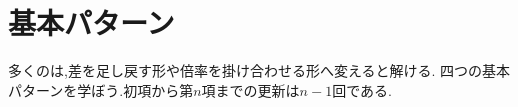 
\section{基本パターン}\label{節：基本パターン}

多くのは,差を足し戻す形や倍率を掛け合わせる形へ変えると解ける.
四つの基本パターンを学ぼう.初項から第$n$項までの更新は$n-1$回である.




